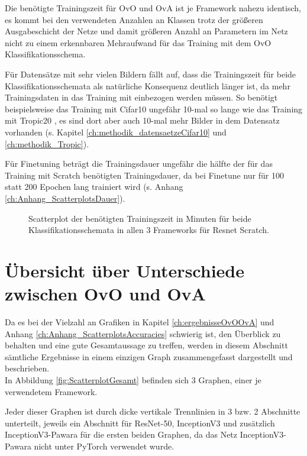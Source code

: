 Die benötigte Trainingszeit für OvO und OvA ist je Framework nahezu identisch, es kommt bei den verwendeten Anzahlen an Klassen trotz der größeren Ausgabeschicht der Netze und damit größeren Anzahl an Parametern im Netz nicht zu einem erkennbaren Mehraufwand für das Training mit dem OvO Klassifikationsschema.

Für Datensätze mit sehr vielen Bildern fällt auf, dass die Trainingszeit für beide Klassifikationsschemata als natürliche Konsequenz deutlich länger ist, da mehr Trainingsdaten in das Training mit einbezogen werden müssen. So benötigt beispielsweise das Training mit Cifar10 \cite{cifar10} ungefähr 10-mal so lange wie das Training mit Tropic20 \cite{pawaraWebsiteDatensaetze}, es sind dort aber auch 10-mal mehr Bilder in dem Datensatz vorhanden (s. Kapitel \ref{ch:methodik_datensaetzeCifar10} und \ref{ch:methodik_Tropic}).

Für Finetuning beträgt die Trainingsdauer ungefähr die hälfte der für das Training mit Scratch benötigten Trainingsdauer, da bei Finetune nur für 100 statt 200 Epochen lang trainiert wird (s. Anhang \ref{ch:Anhang_ScatterplotsDauer}).


\begin{figure}[H]
\begin{adjustbox}{width=\textwidth, center}

\end{adjustbox}
\caption{Scatterplot der benötigten Trainingszeit in Minuten für beide Klassifikationsschemata in allen 3 Frameworks für Resnet Scratch.}
\label{fig:ScatterplotRS-dauer}
\end{figure}

\section{Übersicht über Unterschiede zwischen OvO und OvA}
Da es bei der Vielzahl an Grafiken in Kapitel \ref{ch:ergebnisseOvOOvA} und Anhang \ref{ch:Anhang_ScatterplotsAccuracies} schwierig ist, den Überblick zu behalten und eine gute Gesamtaussage zu treffen, werden in diesem Abschnitt sämtliche Ergebnisse in einem einzigen Graph zusammengefasst dargestellt und beschrieben.\\

In Abbildung \ref{fig:ScatterplotGesamt} befinden sich 3 Graphen, einer je verwendetem Framework.

Jeder dieser Graphen ist durch dicke vertikale Trennlinien in 3 bzw. 2 Abschnitte unterteilt, jeweils ein Abschnitt für ResNet-50, InceptionV3 und zusätzlich InceptionV3-Pawara für die ersten beiden Graphen, da das Netz InceptionV3-Pawara nicht unter PyTorch \cite{pytorch} verwendet wurde.


